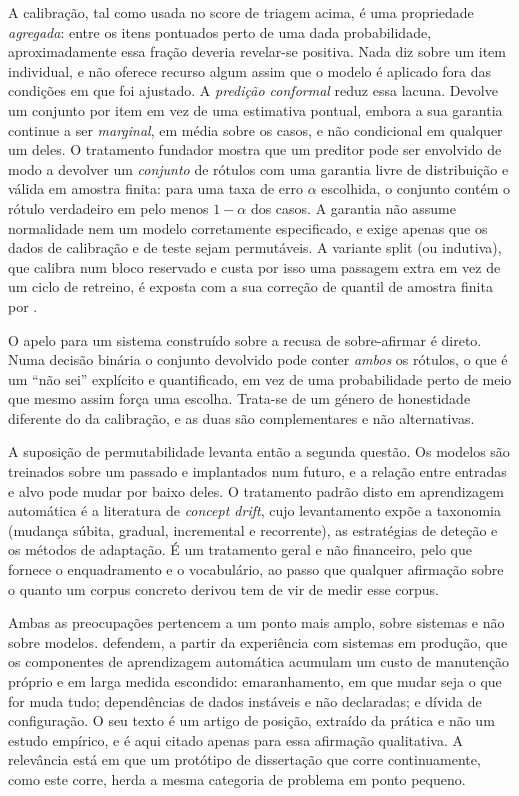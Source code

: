 A calibração, tal como usada no score de triagem acima, é uma propriedade \emph{agregada}: entre os
itens pontuados perto de uma dada probabilidade, aproximadamente essa fração deveria revelar-se
positiva. Nada diz sobre um item individual, e não oferece recurso algum assim que o modelo é
aplicado fora das condições em que foi ajustado. A \emph{predição conformal} reduz essa lacuna.
Devolve um conjunto por item em vez de uma estimativa pontual, embora a sua garantia continue a ser
\emph{marginal}, em média sobre os casos, e não condicional em qualquer um deles. O tratamento
fundador \autocite{vovk2005algorithmic} mostra que um preditor pode ser
envolvido de modo a devolver um \emph{conjunto} de rótulos com uma garantia livre de distribuição e
válida em amostra finita: para uma taxa de erro $\alpha$ escolhida, o conjunto contém o rótulo
verdadeiro em pelo menos $1-\alpha$ dos casos. A garantia não assume normalidade nem um modelo
corretamente especificado, e exige apenas que os dados de calibração e de teste sejam permutáveis. A
variante split (ou indutiva), que calibra num bloco reservado e custa por isso uma passagem extra em
vez de um ciclo de retreino, é exposta com a sua correção de quantil de amostra finita por
\textcite{angelopoulos2023conformal}.

O apelo para um sistema construído sobre a recusa de sobre-afirmar é direto. Numa decisão binária o
conjunto devolvido pode conter \emph{ambos} os rótulos, o que é um ``não sei'' explícito e
quantificado, em vez de uma probabilidade perto de meio que mesmo assim força uma escolha. Trata-se
de um género de honestidade diferente do da calibração, e as duas são complementares e não
alternativas.

A suposição de permutabilidade levanta então a segunda questão. Os modelos são treinados sobre um
passado e implantados num futuro, e a relação entre entradas e alvo pode mudar por baixo deles. O
tratamento padrão disto em aprendizagem automática é a literatura de \emph{concept drift}, cujo
levantamento \autocite{gama2014survey} expõe a taxonomia (mudança súbita, gradual, incremental e
recorrente), as estratégias de deteção e os métodos de adaptação. É um tratamento geral e não
financeiro, pelo que fornece o enquadramento e o vocabulário, ao passo que qualquer afirmação sobre
o quanto um corpus concreto derivou tem de vir de medir esse corpus.

Ambas as preocupações pertencem a um ponto mais amplo, sobre sistemas e não sobre modelos.
\textcite{sculley2015debt} defendem, a partir da experiência com sistemas em produção, que os
componentes de aprendizagem automática acumulam um custo de manutenção próprio e em larga medida
escondido: emaranhamento, em que mudar seja o que for muda tudo; dependências de dados instáveis e
não declaradas; e dívida de configuração. O seu texto é um artigo de posição, extraído da prática e
não um estudo empírico, e é aqui citado apenas para essa afirmação qualitativa. A relevância está em
que um protótipo de dissertação que corre continuamente, como este corre, herda a mesma categoria de
problema em ponto pequeno.

